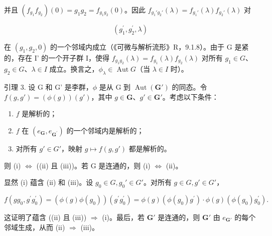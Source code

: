 并且 \((f_{g_1}f_{g_2})(0) = g_1g_2 = f_{g_1g_2}(0)\)。因此 \(f_{g_1'g_2'}(\lambda) = f_{g_1'}(\lambda)f_{g_2'}(\lambda)\) 对

\[
(g _ {1} ^ {\prime}, g _ {2} ^ {\prime}, \lambda)
\]

在 \((g_1, g_2, 0)\) 的一个邻域内成立（《可微与解析流形》R，9.1.8）。由于 G 是紧的，存在 I' 的一个开子群 I，使得 \(f_{g_1 g_2}(\lambda) = f_{g_1}(\lambda) f_{g_2}(\lambda)\) 对所有 \(g_1 \in G\)、\(g_2 \in G\)、\(\lambda \in I\) 成立。换言之，\(\phi_\lambda \in \operatorname{Aut} G\)（当 \(\lambda \in I\) 时）。

引理 3. 设 G 和 G' 是李群，\(\phi\) 是从 G 到 \(\operatorname{Aut}(\mathbf{G}')\) 的同态。令 \(f(g, g') = (\phi(g))(g')\)，其中 \(g \in \mathbf{G}\)、\(g' \in \mathbf{G}'\)。考虑以下条件：

\begin{enumerate}
\def\labelenumi{(\roman{enumi})}
\item
  \(f\) 是解析的；
\item
  \(f\) 在 \((e_{\mathbf{G}}, e_{\mathbf{G}^{\prime}})\) 的一个邻域内是解析的；
\item
  对所有 \(g' \in G'\)，映射 \(g \mapsto f(g, g')\) 都是解析的。
\end{enumerate}

则 (i) \(\Leftrightarrow\) ((ii) 且 (iii))。若 G 是连通的，则 (i) \(\Leftrightarrow\) (ii)。

显然 (i) 蕴含 (ii) 和 (iii)。设 \(g_0 \in G, g_0' \in G'\)。对所有 \(g \in G, g' \in G'\)，

\[
f \left(g g _ {0}, g ^ {\prime} g _ {0} ^ {\prime}\right) = (\phi (g) \phi (g _ {0})) \left(g ^ {\prime} g _ {0} ^ {\prime}\right) = \phi (g) \left(\phi (g _ {0}) g ^ {\prime}\right)\cdot \phi (g) \left(\phi (g _ {0}) g _ {0} ^ {\prime}\right).
\]

这证明了蕴含 ((ii) 且 (iii)) \(\Rightarrow\) (i)。最后，若 \(\mathbf{G}'\) 是连通的，则 \(\mathbf{G}'\) 由 \(e_{\mathbf{G}'}\) 的每个邻域生成，从而 (ii) \(\Rightarrow\) (iii)。


